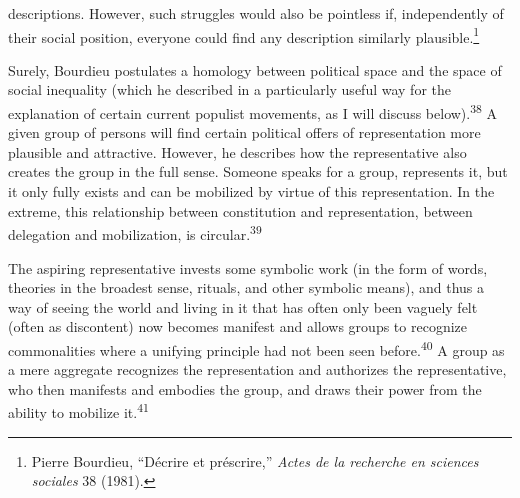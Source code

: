 \documentclass{tufte-handout}
\begin{document}
descriptions.  However, such struggles would also be pointless if,
independently of their social position, everyone could find any
description similarly plausible.\footnote{Pierre Bourdieu, ``Décrire et
  préscrire,'' \emph{Actes de la recherche en sciences sociales} 38
  (1981).}

Surely, Bourdieu postulates a homology between political space and the
space of social inequality (which he described in a particularly useful
way for the explanation of certain current populist movements, as I will
discuss below).\textsuperscript{38} A given group of
persons will find certain political offers of representation more
plausible and attractive. However, he describes how the representative
also creates the group in the full sense. Someone speaks for a group,
represents it, but it only fully exists and can be mobilized by virtue
of this representation. In the extreme, this relationship between
constitution and representation, between delegation and mobilization, is
circular.\textsuperscript{39}

The aspiring representative invests some symbolic work (in the form of
words, theories in the broadest sense, rituals, and other symbolic
means), and thus a way of seeing the world and living in it that has
often only been vaguely felt (often as discontent) now becomes manifest
and allows groups to recognize commonalities where a unifying principle
had not been seen before.\textsuperscript{40} A group as a mere aggregate recognizes the representation and
authorizes the representative, who then manifests and embodies the
group, and draws their power from the ability to mobilize it.\textsuperscript{41}
\end{document}
